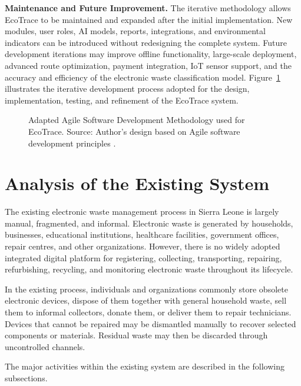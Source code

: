 \textbf{Maintenance and Future Improvement.} The iterative methodology allows
EcoTrace to be maintained and expanded after the initial implementation. New
modules, user roles, AI models, reports, integrations, and environmental
indicators can be introduced without redesigning the complete system. Future
development iterations may improve offline functionality, large-scale deployment,
advanced route optimization, payment integration, IoT sensor support, and the
accuracy and efficiency of the electronic waste classification model.
Figure~\ref{fig:agile-methodology} illustrates the
iterative development process adopted for the design, implementation, testing,
and refinement of the EcoTrace system.

\begin{figure}[H]
  \centering
  \caption{Adapted Agile Software Development Methodology used for EcoTrace. Source: Author's design based on Agile software development principles \citep{agile2001,sommerville2016}.}
  \label{fig:agile-methodology}
\end{figure}

\section{Analysis of the Existing System}

The existing electronic waste management process in Sierra Leone is largely
manual, fragmented, and informal. Electronic waste is generated by households,
businesses, educational institutions, healthcare facilities, government offices,
repair centres, and other organizations. However, there is no widely adopted
integrated digital platform for registering, collecting, transporting, repairing,
refurbishing, recycling, and monitoring electronic waste throughout its lifecycle.

In the existing process, individuals and organizations commonly store
obsolete electronic devices, dispose of them together with general household
waste, sell them to informal collectors, donate them, or deliver them to repair
technicians. Devices that cannot be repaired may be dismantled manually to
recover selected components or materials. Residual waste may then be discarded
through uncontrolled channels.

The major activities within the existing system are described in the following
subsections.

